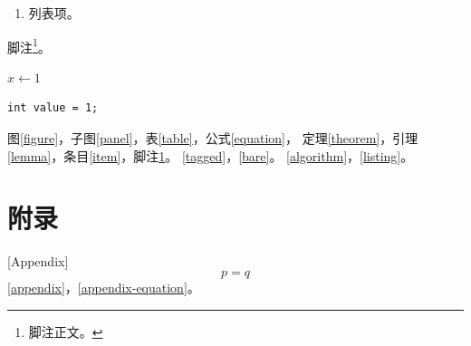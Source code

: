\begin{enumerate}\item 列表项。\label{item}\end{enumerate}
脚注\footnote{脚注正文。\label{note}}。
\ifdefined\HitStyle
  \begin{algorithm}[htbp]\caption{算法}\label{algorithm}$x\gets 1$\;\end{algorithm}
  \begin{lstlisting}[caption={Code},label={listing}]
int value = 1;
  \end{lstlisting}
\fi
\clearpage
图\ref{figure}，子图\ref{panel}，表\ref{table}，公式\eqref{equation}，
定理\ref{theorem}，引理\ref{lemma}，条目\ref{item}，脚注\ref{note}。
\ifdefined\HitTags\eqref{tagged}，\ref{bare}。\fi
\ifdefined\HitStyle\ref{algorithm}，\ref{listing}。\fi
\ifdefined\HitBook
  \appendix\chapter{附录}[Appendix]\label{appendix}
  \begin{equation}p=q\label{appendix-equation}\end{equation}
  \ref{appendix}，\eqref{appendix-equation}。
\fi


